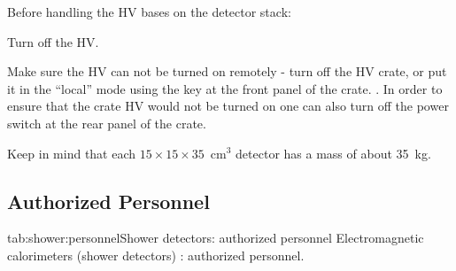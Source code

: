   Before handling the HV bases on the detector stack:
 \begin{list}{.~}{\setlength{\itemsep}{-0.15cm}}
    \item Turn off the HV.
    \item Make sure the HV can not be turned on remotely - turn off the HV crate,
          or put it in the ``local'' mode using the key at the front panel of
          the crate.
        . In order to ensure that the crate HV would not be turned on one can 
          also turn off the power switch at the rear panel of the crate.
 \end{list}


 Keep in mind that each $15\times{}15\times{}35$~cm$^3$ detector has a mass of 
 about 35~kg.

\begin{safetyen}{0}{0}
\section[Authorized  Personnel]{Authorized  Personnel}
\end{safetyen}

\begin{namestab}{tab:shower:personnel}{Shower detectors: authorized personnel}{%
      Electromagnetic calorimeters (shower detectors) : authorized personnel.}
  \BogdanWojtsekhowski{}
  \JackSegal{}
  \HakobVoskanyan{}
\end{namestab}


%
%
%
%
%
%
%
